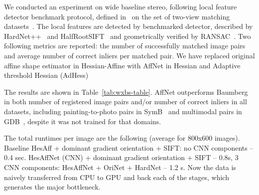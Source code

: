 \documentclass[runningheads]{llncs}
\begin{document}
We conducted an experiment on wide baseline stereo, following local feature detector benchmark protocol, defined in~\cite{WXBS2015} on the set of two-view matching datasets~\cite{Hauagge2012,Yang2007,Zitnick2011,Fernando2015}. The local features are detected by benchmarked detector, described by HardNet++~\cite{HardNet2017} and HalfRootSIFT~\cite{HalfSIFT2007} and geometrically verified by RANSAC~\cite{Lebeda2012}. Two following metrics are reported: the number of successfully matched image pairs and average number of correct inliers per matched pair. We have replaced original affine shape estimator in Hessian-Affine with AffNet in Hessian and Adaptive threshold Hessian (AdHess) 

The results are shown in Table~\ref{tab:wxbs-table}. AffNet outperforms Baumberg in both number of registered image pairs and/or number of correct inliers in all datasets, including painting-to-photo pairs in SymB~\cite{Hauagge2012} and multimodal pairs in GDB~\cite{Yang2007}, despite it was not trained for that domains.

The total runtimes per image are the following (average for 800x600 images). Baseline HesAff + dominant gradient orientation + SIFT: no CNN components – 0.4 sec. HesAffNet (CNN) + dominant gradient orientation + SIFT – 0.8s, 3 CNN components: HesAffNet + OriNet + HardNet – 1.2 s. Now the data is naively transferred from CPU to GPU and back each of the stages, which generates the major bottleneck.
\end{document}
